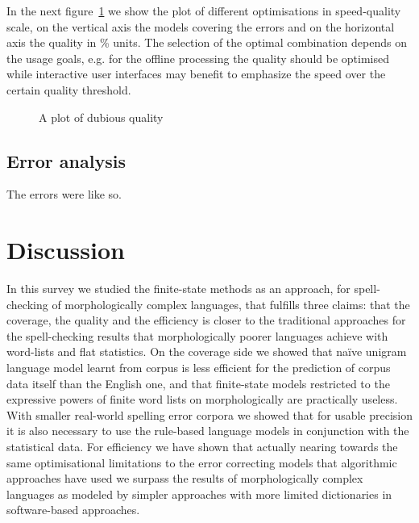 \documentclass[a4paper,12pt]{article}
\begin{document}
In the next figure~\ref{fig:optimisation-speed-quality} we show the plot of
different optimisations in speed-quality scale, on the vertical axis the models
covering the errors and on the horizontal axis the quality in \% units. The
selection of the optimal combination depends on the usage goals, e.g. for the
offline processing the quality should be optimised while interactive user
interfaces may benefit to emphasize the speed over the certain quality
threshold.

\begin{figure}
    \centering
    \caption{A plot of dubious quality
    \label{fig:optimisation-speed-quality}}
\end{figure}

\subsection{Error analysis}
\label{subsec:error-analysis}


The errors were like so.

\section{Discussion}
\label{sec:discussion}

In this survey we studied the finite-state methods as an approach, for
spell-checking of morphologically complex languages, that fulfills three
claims: that the coverage, the quality and the efficiency is closer to the
traditional approaches for the spell-checking results that morphologically
poorer languages achieve with word-lists and flat statistics. On the coverage
side we showed that naïve unigram language model learnt from corpus is
less efficient for the prediction of corpus data itself than the English one,
and that finite-state models restricted to the expressive powers of finite
word lists on morphologically are practically useless. With smaller real-world
spelling error corpora we showed that for usable precision it is also necessary
to use the rule-based language models in conjunction with the statistical
data. For efficiency we have shown that actually nearing towards the same
optimisational limitations to the error correcting models that algorithmic
approaches have used we surpass the results of morphologically complex 
languages as modeled by simpler approaches with more limited dictionaries in
software-based approaches.
\end{document}
